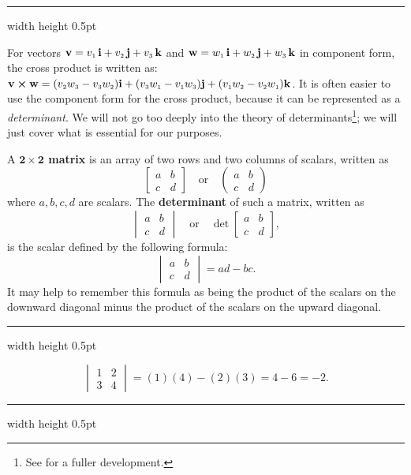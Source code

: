 \hrule width \textwidth height 0.5pt
\vspace{4mm}

For vectors $\textbf{v} = v_{\scriptscriptstyle 1}\,\textbf{i} + v_{\scriptscriptstyle 2}\,\textbf{j} + v_{\scriptscriptstyle 3}\,\textbf{k}$ and $\textbf{w} = w_{\scriptscriptstyle 1}\,\textbf{i} + w_{\scriptscriptstyle 2}\,\textbf{j} + w_{\scriptscriptstyle 3}\,\textbf{k}$ in component form, the cross
product is written as: $\textbf{v} \bm{\times} \textbf{w} = (v_{\scriptscriptstyle 2}w_{\scriptscriptstyle 3} -
v_{\scriptscriptstyle 3}w_{\scriptscriptstyle 2})\textbf{i} + (v_{\scriptscriptstyle 3}w_{\scriptscriptstyle 1} - v_{\scriptscriptstyle 1}w_{\scriptscriptstyle 3})\textbf{j} +
(v_{\scriptscriptstyle 1}w_{\scriptscriptstyle 2} - v_{\scriptscriptstyle 2}w_{\scriptscriptstyle 1})\textbf{k}$.
It is often easier to use the component form for the cross product, because it can be represented as a
\emph{determinant}. We will not go too deeply into the theory of determinants\footnote{See \cite{ar}
for a fuller development.}; we will just cover what is essential for our purposes.

A \textbf{$\bm{2 \times 2}$ matrix} is an array of two rows and two columns of scalars, written as
\begin{displaymath}
 \begin{bmatrix}
  a & b\\
  c & d
 \end{bmatrix}
 \quad\text{or}\quad
 \begin{pmatrix}
  a & b\\
  c & d
 \end{pmatrix}
\end{displaymath}
where $a, b, c, d$ are scalars. 
The \textbf{determinant} of such a matrix, written as
\begin{displaymath}
 \begin{vmatrix}
  a & b\\
  c & d
 \end{vmatrix}
 \quad\text{or}\quad
 \det \begin{bmatrix}
  a & b\\
  c & d
 \end{bmatrix},
\end{displaymath}
is the scalar defined by the following formula:
\begin{displaymath}
 \begin{vmatrix}
  a & b\\
  c & d
 \end{vmatrix}
 = ad - bc.
\end{displaymath}
It may help to remember this formula as being the product of the scalars on the downward diagonal minus the product of
the scalars on the upward diagonal.

\vspace{3mm}
\hrule width \textwidth height 0.5pt
\begin{exmp}
 \begin{displaymath}
  \begin{vmatrix}
   1 & 2\\
   3 & 4
  \end{vmatrix}
  = (1)(4) - (2)(3) = 4 - 6 = -2.
 \end{displaymath}
\end{exmp}
\hrule width \textwidth height 0.5pt
\vspace{3mm}


